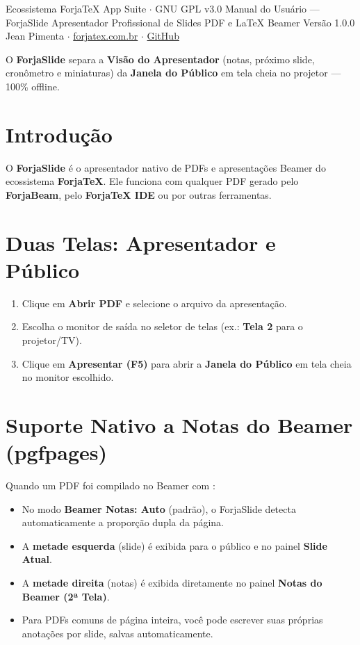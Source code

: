 \documentclass[11pt,a4paper]{article}
\begin{document}
  {Ecossistema ForjaTeX App Suite $\cdot$ GNU GPL v3.0}
  {Manual do Usuário --- ForjaSlide}
  {Apresentador Profissional de Slides PDF e \LaTeX{} Beamer}
  {Versão 1.0.0}
  {Jean Pimenta $\cdot$ \href{https://forjatex.com.br}{\color{fjsky}forjatex.com.br} $\cdot$ \href{https://github.com/jeanjpimenta/forjatex-suite}{\color{fjsky}GitHub}}


\begin{fjcallout}
O \textbf{ForjaSlide} separa a \textbf{Visão do Apresentador} (notas, próximo slide, cronômetro e miniaturas) da \textbf{Janela do Público} em tela cheia no projetor --- 100\% offline.
\end{fjcallout}

\section{Introdução}
O \textbf{ForjaSlide} é o apresentador nativo de PDFs e apresentações Beamer do ecossistema \textbf{ForjaTeX}. Ele funciona com qualquer PDF gerado pelo \textbf{ForjaBeam}, pelo \textbf{ForjaTeX IDE} ou por outras ferramentas.

\section{Duas Telas: Apresentador e Público}
\begin{enumerate}
  \item Clique em \textbf{Abrir PDF} e selecione o arquivo  da apresentação.
  \item Escolha o monitor de saída no seletor de telas (ex.: \textbf{Tela 2} para o projetor/TV).
  \item Clique em \textbf{Apresentar (F5)} para abrir a \textbf{Janela do Público} em tela cheia no monitor escolhido.
\end{enumerate}

\section{Suporte Nativo a Notas do Beamer (pgfpages)}
Quando um PDF foi compilado no Beamer com :
\begin{itemize}
  \item No modo \textbf{Beamer Notas: Auto} (padrão), o ForjaSlide detecta automaticamente a proporção dupla da página.
  \item A \textbf{metade esquerda} (slide) é exibida para o público e no painel \textbf{Slide Atual}.
  \item A \textbf{metade direita} (notas) é exibida diretamente no painel \textbf{Notas do Beamer (2ª Tela)}.
  \item Para PDFs comuns de página inteira, você pode escrever suas próprias anotações por slide, salvas automaticamente.
\end{itemize}
\end{document}

